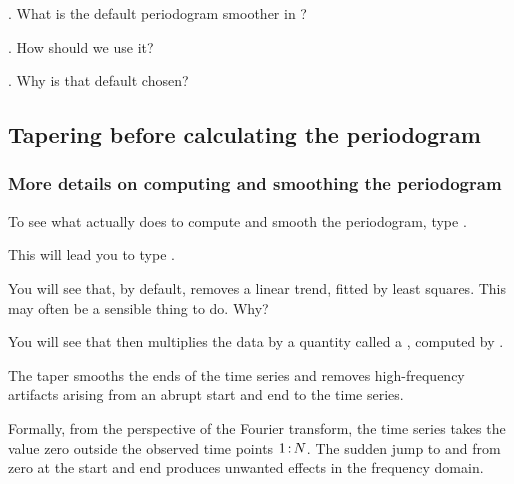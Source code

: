 \begin{frame}[fragile]

\myquestion.  What is the default periodogram smoother in {\Rlanguage}?


\myquestion.  How should we use it?


\myquestion. Why is that default chosen?


\end{frame}

\subsection{Tapering before calculating the  periodogram}

\begin{frame}[fragile]
\frametitle{More details on computing and smoothing the periodogram}
\bi
\item  To see what {\Rlanguage} actually does to compute and smooth the periodogram, type . 

\item  This will lead you to type .

\item  You will see that, by default, {\Rlanguage} removes a linear trend, fitted by least squares. This may often be a sensible thing to do. Why?

\item  You will see that {\Rlanguage} then multiplies the data by a quantity called a , computed by . 

\item The taper smooths the ends of the time series and removes high-frequency artifacts arising from an abrupt start and end to the time series.

\item Formally, from the perspective of the Fourier transform, the time series takes the value zero outside the observed time points $1{{\hspace{0.5mm}:\hspace{0.5mm}}}N$. The sudden jump to and from zero at the start and end produces unwanted effects in the frequency domain.

\ei

\end{frame}

